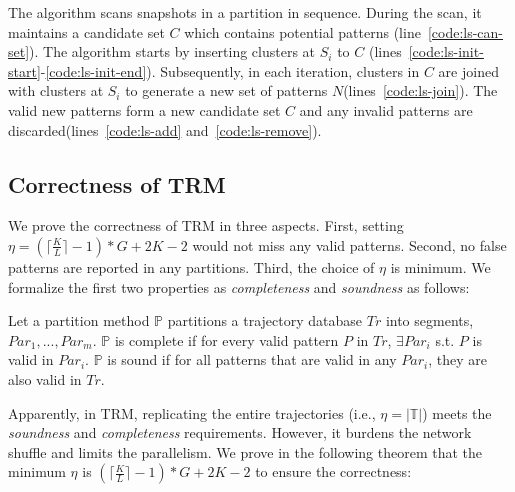 The algorithm scans snapshots in a partition in sequence. During the scan, it
maintains a candidate set $C$ which contains potential patterns (line~\ref{code:ls-can-set}).
The algorithm starts by inserting clusters at $S_i$ to $C$ (lines~\ref{code:ls-init-start}-\ref{code:ls-init-end}).
Subsequently, in each iteration, clusters in $C$ are joined with clusters at $S_i$ to generate
a new set of patterns $N$(lines~\ref{code:ls-join}). The valid new patterns 
form a new candidate set $C$ and any invalid patterns are discarded(lines~\ref{code:ls-add} and~\ref{code:ls-remove}).


\subsection{Correctness of TRM}
We prove the correctness of TRM in three aspects. First,
setting $\eta = (\lceil \frac{K}{L} \rceil -1)*G+2K -2$
would not miss any valid patterns. Second, no false patterns
are reported in any partitions. Third, the choice of $\eta$ is
minimum. We formalize the first two 
properties as \emph{completeness} and \emph{soundness} as follows:

\begin{definition}
Let a partition method $\mathbb{P}$ partitions a trajectory database $Tr$ 
into segments, $Par_1,...,Par_m$. $\mathbb{P}$ is complete 
if for every valid pattern $P$ in $Tr$, $\exists Par_i$ s.t. $P$ is valid in $Par_i$. 
$\mathbb{P}$ is sound if for all patterns that are valid in any $Par_i$, they are also valid in $Tr$.
\end{definition}

Apparently, in TRM, replicating the entire trajectories (i.e., $\eta=\mathbb{|T|}$)
meets the \emph{soundness} and \emph{completeness} requirements. However, it burdens the network shuffle and limits the parallelism. We prove in the following theorem 
that the minimum $\eta$ is $(\lceil \frac{K}{L} \rceil -1)*G+2K -2$ 
to ensure the correctness:


